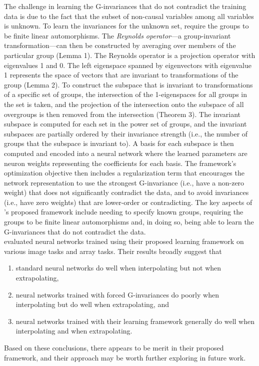 The challenge in learning the G-invariances that do not contradict the training data is due to the fact that the subset of non-causal variables among all variables is unknown. To learn the invariances for the unknown set, \citeauthor{Mouli:2021} require the groups to be finite linear automorphisms. The \textit{Reynolds operator}---a group-invariant transformation---can then be constructed by averaging over members of the particular group (Lemma 1). The Reynolds operator is a projection operator with eigenvalues 1 and 0. The left eigenspace spanned by eigenvectors with eigenvalue 1 represents the space of vectors that are invariant to transformations of the group (Lemma 2). To construct the subspace that is invariant to transformations of a specific set of groups, the intersection of the 1-eigenspaces for all groups in the set is taken, and the projection of the intersection onto the subspace of all overgroups is then removed from the intersection (Theorem 3). The invariant subspace is computed for each set in the power set of groups, and the invariant subspaces are partially ordered by their invariance strength (i.e., the number of groups that the subspace is invariant to). A basis for each subspace is then computed and encoded into a neural network where the learned parameters are neuron weights representing the coefficients for each basis. The framework's optimization objective then includes a regularization term that encourages the network representation to use the strongest G-invariance (i.e., have a non-zero weight) that does not significantly contradict the data, and to avoid invariances (i.e., have zero weights) that are lower-order or contradicting. The key aspects of \citeauthor{Mouli:2021}'s proposed framework include needing to specify known groups, requiring the groups to be finite linear automorphisms and, in doing so, being able to learn the G-invariances that do not contradict the data.
\\

\textcite{Mouli:2021} evaluated neural networks trained using their proposed learning framework on various image tasks and array tasks. Their results broadly suggest that
\begin{enumerate}

\item
standard neural networks do well when interpolating but not when extrapolating,

\item
neural networks trained with forced G-invariances do poorly when interpolating but do well when extrapolating, and

\item
neural networks trained with their learning framework generally do well when interpolating and when extrapolating.

\end{enumerate}
Based on these conclusions, there appears to be merit in their proposed framework, and their approach may be worth further exploring in future work.

